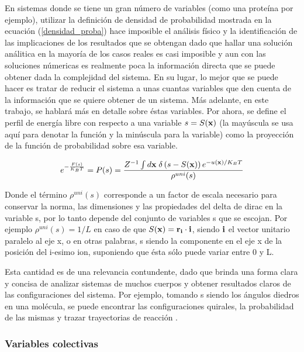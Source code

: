 \documentclass [11pt]{article}
\begin{document}
En sistemas donde se tiene un gran número de variables (como una proteína por ejemplo), utilizar la definición de densidad de probabilidad mostrada en la ecuación (\ref{densidad_proba}) hace imposible el análisis físico y la identificación de las implicaciones de los resultados que se obtengan dado que hallar una solución análitica en la mayoría de los casos reales es casi imposible y aun con las soluciones númericas es realmente poca la información directa que se puede obtener dada la complejidad del sistema. En su lugar, lo mejor que se puede hacer es tratar de reducir el sistema a unas cuantas variables que den cuenta de la información que se quiere obtener de un sistema. Más adelante, en este trabajo, se hablará más en detalle sobre éstas variables. Por ahora, se define el perfil de energía libre con respecto a una variable $s= S({\bf x})$ (la mayúscula se usa aquí para denotar la función y la minúscula para la variable) como la proyección de la función de probabilidad sobre esa variable.

\begin{equation}\label{FES}
    e^{-\frac{F(s)}{K_BT}}=P(s)= \frac{Z^{-1}\int d{\bf x}\hspace{0.1 cm}\delta \left(s-S({\bf x})\right)e^{-u({\bf x})/K_BT}}{\rho^{uni}(s)}
\end{equation}

Donde el término $\rho^{uni}(s)$ corresponde a un factor de escala necesario para conservar la norma, las dimensiones y las propiedades del delta de dirac en la variable s, por lo tanto depende del conjunto de variables s que se escojan. Por ejemplo $\rho^{uni}(s)=1/L$ en caso de que $S({\bf x})={\bf r_i}\cdot{\bf i}$, siendo ${\bf i}$ el vector unitario paralelo al eje x, o en otras palabras, s siendo la componente en el eje x de la posición del i-esimo ion, suponiendo que ésta sólo puede variar entre 0 y L.

Esta cantidad es de una relevancia contundente, dado que brinda una forma clara y concisa de analizar sistemas de muchos cuerpos y obtener resultados claros de las configuraciones del sistema. Por ejemplo, tomando s siendo los ángulos diedros en una molécula, se puede encontrar las configuraciones quirales, la probabilidad de las mismas y trazar trayectorias de reacción \cite{laio-gervasio}.

\subsubsection{Variables colectivas}
\end{document}
